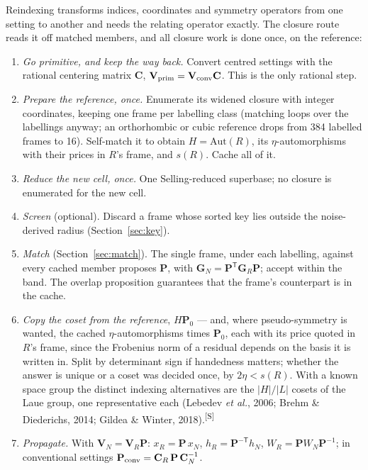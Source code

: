 \documentclass[preprint,pdf]{iucr}          %
\makeatletter
\newcommand{\Gmet}{\mathbf{G}}
\newcommand{\Pop}{\mathbf{P}}
\newcommand{\Bbasis}{\mathbf{V}}
\newcommand{\Cmat}{\mathbf{C}}
\newcommand{\chk}[1]{\textsuperscript{[S\@nameuse{zn@#1}]}}
\makeatother
\begin{document}
Reindexing transforms indices, coordinates and symmetry operators from one setting to another and needs the relating operator exactly. The closure route reads it off matched members, and all closure work is done once, on the reference:
\begin{enumerate}
\item \emph{Go primitive, and keep the way back.} Convert centred settings with the rational centering matrix $\Cmat$, $\Bbasis_{\rm prim}=\Bbasis_{\rm conv}\Cmat$. This is the only rational step.
\item \emph{Prepare the reference, once.} Enumerate its widened closure with integer coordinates, keeping one frame per labelling class (matching loops over the labellings anyway; an orthorhombic or cubic reference drops from 384 labelled frames to 16). Self-match it to obtain $H=\mathrm{Aut}(R)$, its $\eta$-automorphisms with their prices in $R$'s frame, and $s(R)$. Cache all of it.
\item \emph{Reduce the new cell, once.} One Selling-reduced superbase; no closure is enumerated for the new cell.
\item \emph{Screen} (optional). Discard a frame whose sorted key lies outside the noise-derived radius (Section~\ref{sec:key}).
\item \emph{Match} (Section~\ref{sec:match}). The single frame, under each labelling, against every cached member proposes $\Pop$, with $\Gmet_N=\Pop^{\mathsf T}\Gmet_R\Pop$; accept within the band. The overlap proposition guarantees that the frame's counterpart is in the cache.
\item \emph{Copy the coset from the reference}, $H\Pop_0$ --- and, where pseudo-symmetry is wanted, the cached $\eta$-automorphisms times $\Pop_0$, each with its price quoted in $R$'s frame, since the Frobenius norm of a residual depends on the basis it is written in. Split by determinant sign if handedness matters; whether the answer is unique or a coset was decided once, by $2\eta<s(R)$. With a known space group the distinct indexing alternatives are the $|H|/|L|$ cosets of the Laue group, one representative each (Lebedev \emph{et al.}, 2006; Brehm \& Diederichs, 2014; Gildea \& Winter, 2018).\chk{z:coset-reps}
\item \emph{Propagate.} With $\Bbasis_N=\Bbasis_R\Pop$: $x_R=\Pop\,x_N$, $h_R=\Pop^{-\mathsf T}h_N$, $W_R=\Pop W_N\Pop^{-1}$; in conventional settings $\Pop_{\rm conv}=\Cmat_R\,\Pop\,\Cmat_N^{-1}$.
\end{enumerate}
\end{document}
